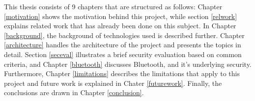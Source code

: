 This thesis consists of 9 chapters that are structured as follows: Chapter \ref{motivation} shows the motivation behind this project, while section \ref{relwork} explains related work that has already been done on this subject. In Chapter \ref{background}, the background of technologies used is described further. Chapter \ref{architecture} handles the architecture of the project and presents the topics in detail. Section \ref{seceval} illustrates a brief security evaluation based on common criteria, and Chapter \ref{bluetooth} discusses Bluetooth, and it's underlying security. Furthermore, Chapter \ref{limitations} describes the limitations that apply to this project and future work is explained in Chater \ref{futurework}. Finally, the conclusions are drawn in Chapter \ref{conclusion}.

